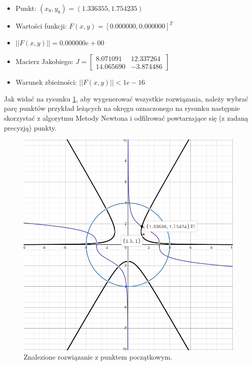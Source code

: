 \documentclass[a4paper,12pt]{article}
\begin{document}
\begin{enumerate}
\begin{itemize}
    \item Punkt: $(x_8, y_8) = (1.336355, 1.754235)$
    \item Wartości funkcji: $F(x,y) = [0.000000, 0.000000]^T$
    \item $||F(x,y)|| = 0.000000e+00$
    \item Macierz Jakobiego: $J = \begin{bmatrix} 8.071091 & 12.337264 \\ 14.065690 & -3.874486 \end{bmatrix}$
    \item Warunek zbieżności: $||F(x,y)|| < 1e-16$
  \end{itemize}
\end{enumerate}
 
 Jak widać na rysunku \ref{fig:task_three}, aby wygenerować wszystkie rozwiązania, należy wybrać parę punktów przykład leżących na okręgu oznaczonego na rysunku następnie skorzystać z algorytmu Metody Newtona i odfilrować powtarzające się (z zadaną precyzją) punkty.

\begin{figure}[H]
    \centering
    \includegraphics[width=1\linewidth]{task_three.PNG}
    \caption{Znalezione rozwiązanie z punktem początkowym.}
    \label{fig:task_three}
\end{figure}
\end{document}
